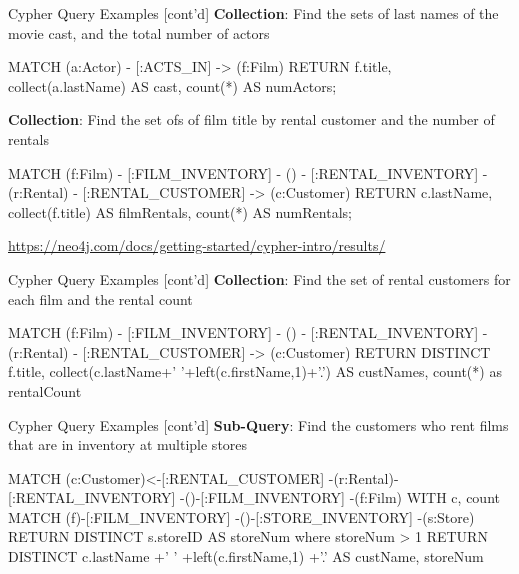\documentclass[ignorenonframetext,xcolor=x11names]{beamer}
\begin{document}
\begin{frame}[label=withcode,fragile]{Cypher Query Examples \small [cont'd]}
\textbf{Collection}: Find the sets of last names of the movie cast, and the total number of actors
\footnotesize
\begin{cyphercode}
MATCH (a:Actor) - [:ACTS_IN] -> (f:Film) 
RETURN f.title, 
       collect(a.lastName) AS cast, 
       count(*) AS numActors;
\end{cyphercode}
\normalsize
\textbf{Collection}: Find the set ofs of film title by rental customer and the number of rentals
\footnotesize
\begin{cyphercode}
MATCH (f:Film) - [:FILM_INVENTORY] 
    - () - [:RENTAL_INVENTORY] 
    - (r:Rental) - [:RENTAL_CUSTOMER] 
    -> (c:Customer)
RETURN c.lastName, 
       collect(f.title) AS filmRentals, 
       count(*) AS numRentals;
\end{cyphercode}

\scriptsize
\url{https://neo4j.com/docs/getting-started/cypher-intro/results/}
\end{frame}


\begin{frame}[label=withcode,fragile]{Cypher Query Examples \small [cont'd]}
\textbf{Collection}: Find the set of rental customers for each film and the rental count
\footnotesize
\begin{cyphercode}
MATCH (f:Film) - [:FILM_INVENTORY] 
    - () - [:RENTAL_INVENTORY] 
    - (r:Rental) - [:RENTAL_CUSTOMER] 
    -> (c:Customer)
RETURN DISTINCT f.title, 
      collect(c.lastName+' '+left(c.firstName,1)+'.') 
          AS custNames, 
      count(*) as rentalCount
\end{cyphercode}
\end{frame}

\begin{frame}[label=withcode,fragile]{Cypher Query Examples \small [cont'd]}
\textbf{Sub-Query}: Find the customers who rent films that are in inventory at multiple stores
\footnotesize
\begin{cyphercode}
MATCH (c:Customer)<-[:RENTAL_CUSTOMER]
     -(r:Rental)-[:RENTAL_INVENTORY]
     -()-[:FILM_INVENTORY]
     -(f:Film) 
WITH c, count{ 
  MATCH (f)-[:FILM_INVENTORY]
       -()-[:STORE_INVENTORY]
       -(s:Store) 
  RETURN DISTINCT s.storeID
} AS storeNum
where storeNum > 1
RETURN DISTINCT 
  c.lastName
       +' '
       +left(c.firstName,1)
       +'.' AS custName, 
  storeNum
\end{cyphercode}
\end{frame}
\end{document}
